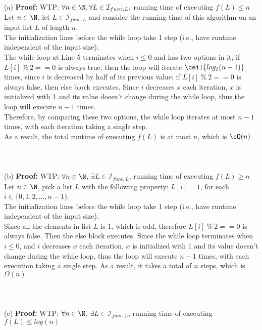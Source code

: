 \documentclass[12pt]{article}
\begin{document}
(a) \textbf{Proof:} WTP: $\forall n \in \N, \forall L \in \mathcal{I}_{func,L},$ running time of executing $f(L) \le n$\\
Let $n \in \N$, let $L \in \mathcal{I}_{func,L}$ and consider the running time of this algorithm on an input list $L$ of length $n$.\\
The initialization lines before the while loop take 1 step (i.e., have runtime independent of the input size).\\
The while loop at Line 5 terminates when $i \le 0$ and has two options in it, if $L[i]\ \%\ 2 == 0$ is always true, then the loop will iterate $\ceil{log_2(n-1)}$ times, since $i$ is decreased by half of its previous value; if $L[i]\ \%\ 2 == 0$ is always false, then else block executes. Since $i$ decreases $x$ each iteration, $x$ is initialized with 1 and its value doesn't change during the while loop, thus the loop will execute $n-1$ times.\\
Therefore, by comparing these two options, the while loop iterates at most $n-1$ times, with each iteration taking a single step.\\
As a result, the total runtime of executing $f(L)$ is at most $n$, which is $\cO(n)$\\
\\
\\
\\
(b) \textbf{Proof:} WTP: $\forall n \in \N$, $\exists L \in \mathcal{I}_{func,L}$, running time of executing $f(L) \ge n$\\
Let $n \in \N$, pick a list $L$ with the following property: $L[i] = 1$, for each $i \in \{0, 1, 2,..., n-1\}$.\\
The initialization lines before the while loop take 1 step (i.e., have runtime independent of the input size).\\
Since all the elements in list $L$ is 1, which is odd, therefore $L[i]\  \% \ 2 == 0$ is always false. Then the else block executes. Since the while loop terminates when $i \le 0$, and $i$ decreases $x$ each iteration, $x$ is initialized with 1 and its value doesn't change during the while loop, thus the loop will execute $n-1$ times, with each execution taking a single step. As a result, it takes a total of $n$ steps, which is $\Omega(n)$\\
\\
\\
\\
(c) \textbf{Proof:} WTP: $\forall n \in \N$, $\exists L \in \mathcal{I}_{func,L}$, running time of executing $f(L) \le log(n)$\\
\end{document}
